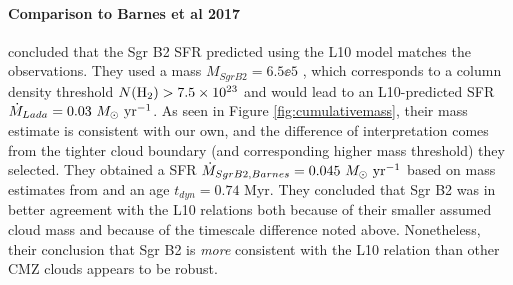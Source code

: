 \documentclass[twocolumn]{aastex61}
\begin{document}

\paragraph{Comparison to Barnes et al 2017}
\citet{Barnes2017b} concluded that the Sgr B2 SFR predicted using the L10 model
matches the observations.  They used a mass $M_{Sgr B2}=6.5\ee{5}$ \msun, which
corresponds to a column density threshold $N(\textrm{H}_{2})>7.5\times10^{23}$ \persc and would
lead to an L10-predicted SFR $\dot{M}_{Lada}=0.03~M_{\odot}~\textrm{yr}^{-1}$.  As seen in
Figure \ref{fig:cumulativemass}, their mass estimate is consistent with our
own, and the difference of interpretation comes from the tighter cloud boundary
(and corresponding higher mass threshold) they selected.  They obtained a SFR
$\dot{M}_{Sgr B2,Barnes} = 0.045~M_{\odot}~\textrm{yr}^{-1}$ based on mass estimates from
\citet{Schmiedeke2016a} and an age $t_{dyn}=0.74$ Myr.  They concluded that Sgr
B2 was in better agreement with the L10 relations both because of their smaller
assumed cloud mass and because of the timescale difference noted above.  
Nonetheless, their conclusion that Sgr B2 is \emph{more} consistent with the L10
relation than other CMZ clouds appears to be robust.

\end{document}
